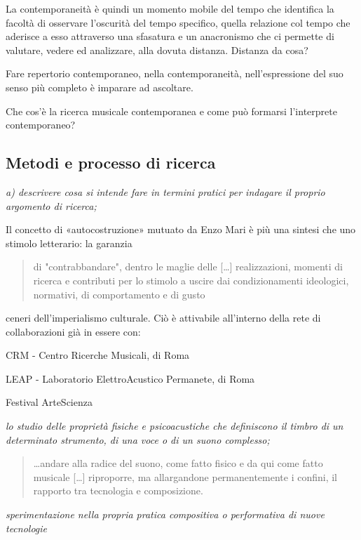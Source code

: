 \documentclass{gs-adonis}
\begin{document}
La contemporaneità è quindi un momento mobile del tempo che identifica la
facoltà di osservare l’oscurità del tempo specifico, quella relazione col
tempo che aderisce a esso attraverso una sfasatura e un anacronismo che ci
permette di valutare, vedere ed analizzare, alla dovuta distanza. Distanza da
cosa?

Fare repertorio contemporaneo, nella contemporaneità, nell’espressione del suo
senso più completo è imparare ad ascoltare.

Che cos'è la ricerca musicale contemporanea e come può formarsi l'interprete
contemporaneo?

\subsection{Metodi e processo di ricerca}%

\emph{a) descrivere cosa si intende fare in termini pratici per indagare il proprio argomento di ricerca;}

Il concetto di «autocostruzione» mutuato da Enzo Mari \cite{mari2002} è più una
sintesi che uno stimolo letterario: la garanzia

\begin{quote}
  di "contrabbandare", dentro le maglie delle […] realizzazioni, momenti di
  ricerca e contributi per lo stimolo a uscire dai condizionamenti ideologici,
  normativi, di comportamento e di gusto
\end{quote}

ceneri dell'imperialismo culturale. Ciò è attivabile all'interno della rete di
collaborazioni già in essere con:

CRM - Centro Ricerche Musicali, di Roma

LEAP - Laboratorio ElettroAcustico Permanete, di Roma

Festival ArteScienza

\emph{lo studio delle proprietà fisiche e psicoacustiche che definiscono il timbro di un determinato strumento, di una voce o di un suono complesso;}

\begin{quote}
  …andare alla radice del suono, come fatto fisico e da qui come fatto musicale […] riproporre, ma allargandone permanentemente i confini, il rapporto tra tecnologia e composizione.
\end{quote}

\emph{sperimentazione nella propria pratica compositiva o performativa di nuove tecnologie}
\end{document}

